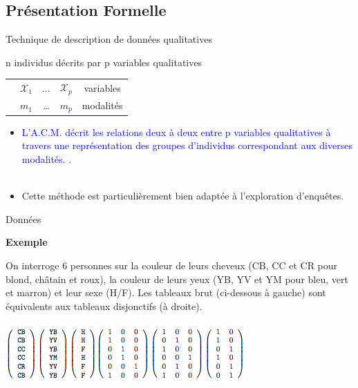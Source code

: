 \documentclass[10pt]{beamer}
\begin{document}





\subsection{Présentation Formelle}

\begin{frame}{Technique de description de données qualitatives}

n individus décrits par p variables qualitatives\\

\begin{table}
\begin{tabular}{ccccc}

 & $\mathcal{X}_1$& $\ldots$ & $ \mathcal{X}_p$& variables \\
 & $m_1$ & \ldots  &$m_p$ & modalités 
 
\end{tabular} 
\end{table}

\begin{itemize}
\item \textcolor{blue}{L'A.C.M. décrit les relations deux à deux entre p variables qualitatives à travers une représentation des groupes d'individus correspondant aux diverses modalités.} .\\~\\

\item Cette méthode est particulièrement bien adaptée à l'exploration d'enquêtes.
\end{itemize}

\end{frame}



\begin{frame}{Données  }

\textbf{Exemple} 

On interroge 6 personnes sur la couleur de leurs
cheveux (CB, CC et CR pour blond, châtain et roux), la couleur
de leurs yeux (YB, YV et YM pour bleu, vert et marron) et leur
sexe (H/F).   Les tableaux brut (ci-dessous à gauche) sont équivalents aux tableaux disjonctifs (à droite).\\~\\

\centering 
\includegraphics[scale=0.8]{disj.png} 


\end{frame}
\end{document}

